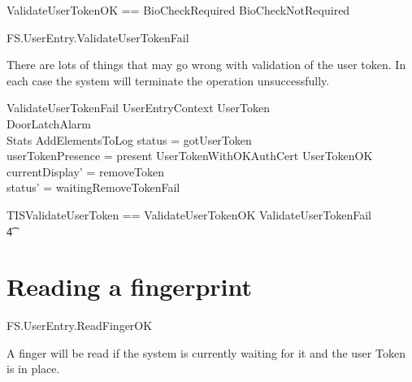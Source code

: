\begin{zed}
ValidateUserTokenOK == BioCheckRequired \lor BioCheckNotRequired
\end{zed}

\begin{traceunit}{FS.UserEntry.ValidateUserTokenFail}
\end{traceunit}



There are lots of things that may go wrong with validation of the user
token. In each case the system will terminate the operation unsuccessfully.

\begin{schema}{ValidateUserTokenFail}
        UserEntryContext
\also
        \Xi UserToken
\\      \Xi DoorLatchAlarm
\\      \Xi Stats       
\also
        AddElementsToLog
\where
        status = gotUserToken
\\      userTokenPresence = present
\also
        \lnot UserTokenWithOKAuthCert \land \lnot UserTokenOK 
\also
        currentDisplay' = removeToken
\\      status' = waitingRemoveTokenFail
\end{schema}

\begin{zed}
        TISValidateUserToken == ValidateUserTokenOK \lor
        ValidateUserTokenFail 
\\ \t4 \lor
        [~UserTokenTorn | status = gotUserToken ]
\end{zed}

\section{Reading a fingerprint}

\begin{traceunit}{FS.UserEntry.ReadFingerOK}
\end{traceunit}

A finger will be read if the system is currently waiting for it and
the user Token is in place.

